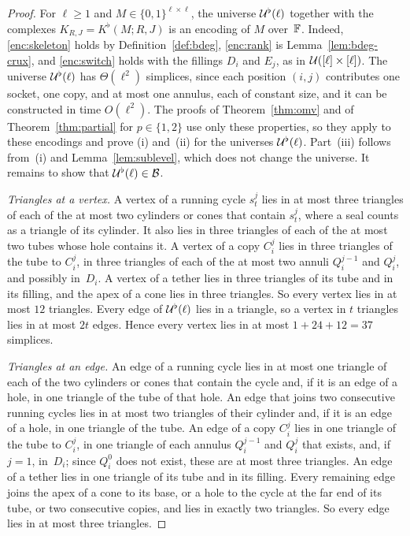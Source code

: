 \begin{proof}
For $\ell\ge1$ and $M\in\{0,1\}^{\ell\times\ell}$, the universe $\mathcal{U}^{\flat}(\ell)$ together with the complexes $K_{R,J}=K^{\flat}(M;R,J)$ is an encoding of $M$ over~$\mathbb{F}$.
Indeed, \ref{enc:skeleton} holds by Definition~\ref{def:bdeg}, \ref{enc:rank} is Lemma~\ref{lem:bdeg-crux}, and \ref{enc:switch} holds with the fillings $D_i$ and $E_j$, as in $\mathcal{U}([\ell]\times[\ell])$.
The universe $\mathcal{U}^{\flat}(\ell)$ has $\Theta(\ell^2)$ simplices, since each position $(i,j)$ contributes one socket, one copy, and at most one annulus, each of constant size, and it can be constructed in time $O(\ell^2)$.
The proofs of Theorem~\ref{thm:omv} and of Theorem~\ref{thm:partial} for $p\in\{1,2\}$ use only these properties, so they apply to these encodings and prove (i) and~(ii) for the universes $\mathcal{U}^{\flat}(\ell)$.
Part~(iii) follows from~(i) and Lemma~\ref{lem:sublevel}, which does not change the universe.
It remains to show that $\mathcal{U}^{\flat}(\ell)\in\mathcal{B}$.

\emph{Triangles at a vertex.}
A vertex of a running cycle $s^j_t$ lies in at most three triangles of each of the at most two cylinders or cones that contain $s^j_t$, where a seal counts as a triangle of its cylinder.
It also lies in three triangles of each of the at most two tubes whose hole contains it.
A vertex of a copy $C_i^j$ lies in three triangles of the tube to $C_i^j$, in three triangles of each of the at most two annuli $Q_i^{j-1}$ and $Q_i^j$, and possibly in~$D_i$.
A vertex of a tether lies in three triangles of its tube and in its filling, and the apex of a cone lies in three triangles.
So every vertex lies in at most $12$ triangles.
Every edge of $\mathcal{U}^{\flat}(\ell)$ lies in a triangle, so a vertex in $t$ triangles lies in at most $2t$ edges.
Hence every vertex lies in at most $1+24+12=37$ simplices.

\emph{Triangles at an edge.}
An edge of a running cycle lies in at most one triangle of each of the two cylinders or cones that contain the cycle and, if it is an edge of a hole, in one triangle of the tube of that hole.
An edge that joins two consecutive running cycles lies in at most two triangles of their cylinder and, if it is an edge of a hole, in one triangle of the tube.
An edge of a copy $C_i^j$ lies in one triangle of the tube to $C_i^j$, in one triangle of each annulus $Q_i^{j-1}$ and $Q_i^j$ that exists, and, if $j=1$, in~$D_i$; since $Q_i^0$ does not exist, these are at most three triangles.
An edge of a tether lies in one triangle of its tube and in its filling.
Every remaining edge joins the apex of a cone to its base, or a hole to the cycle at the far end of its tube, or two consecutive copies, and lies in exactly two triangles.
So every edge lies in at most three triangles.
\end{proof}


